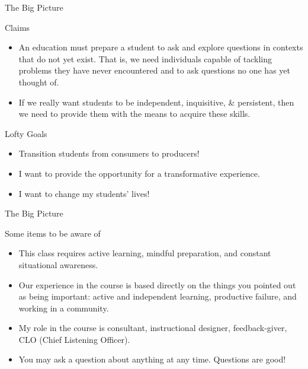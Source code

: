 \documentclass[10pt]{beamer}
\begin{document}

\begin{frame}{The Big Picture}

\begin{block}{Claims}
\vspace{-.75em}
\begin{itemize}
\item An education must prepare a student to ask and explore questions in contexts that do not yet exist. That is, we need individuals capable of tackling problems they have never encountered and to ask questions no one has yet thought of.
\item If we really want students to be independent, inquisitive, \& persistent, then we need to provide them with the means to acquire these skills.
\end{itemize}
\end{block}

\begin{block}{Lofty Goals}
\vspace{-.75em}
\begin{itemize}
\item Transition students from consumers to producers!
\item I want to provide the opportunity for a transformative experience. 
\item I want to change my students' lives!
\end{itemize}
\end{block}

\end{frame}


\begin{frame}{The Big Picture}

\begin{block}{Some items to be aware of}
\vspace{-.75em}
\begin{itemize}
\item This class requires \alert{active learning}, \alert{mindful preparation}, and \alert{constant situational awareness}. 
\item Our experience in the course is based directly on the things you pointed out as being important: \alert{active and independent learning}, \alert{productive failure}, and \alert{working in a community}.  
\item My role in the course is \alert{consultant}, \alert{instructional designer}, \alert{feedback-giver}, \alert{CLO} (Chief Listening Officer). 
\item You may ask a question about anything at any time. Questions are good!
\end{itemize}
\end{block}

\end{frame}

\end{document}
